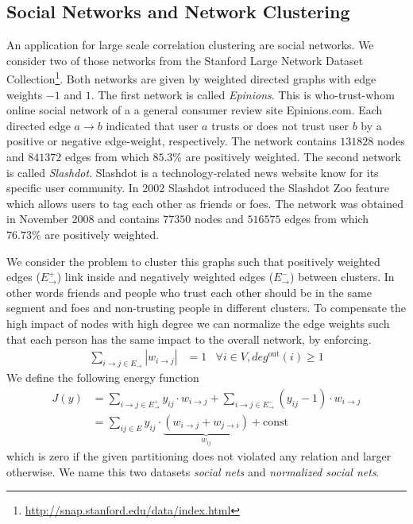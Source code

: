 \documentclass[10pt,twocolumn,letterpaper]{article}
\theoremstyle{definition}
\begin{document}
\subsection{Social Networks and Network Clustering}\label{sec:nets}
An application for large scale correlation clustering are social networks.
We consider two of those networks from the Stanford Large Network Dataset Collection\footnote{\url{http://snap.stanford.edu/data/index.html}}.
Both networks are given by weighted directed graphs with edge weights $-1$ and $1$. 
%
The first network is called \emph{Epinions}. 
This is who-trust-whom online social network of a a general consumer review site Epinions.com. 
Each directed edge $a\to b$ indicated that user $a$ trusts  or does not trust user $b$ by a  positive or negative edge-weight, respectively.
The network contains $131828$ nodes and $841372$ edges from which $85.3\%$ are positively weighted.
%
The second network is called \emph{Slashdot}. 
Slashdot is a technology-related news website know for its specific user community. 
In 2002 Slashdot introduced the Slashdot Zoo feature which allows users to tag each other as friends or foes. 
The network was obtained in November 2008 and contains $77350$ nodes and $516575$ edges from which $76.73\%$ are positively weighted.

We consider the problem to cluster this graphs such that positively weighted edges ($E^+_{\to}$) link inside and negatively weighted edges ($E^-_{\to}$) between clusters.
In other words friends and people who trust each other should be in the same segment and foes and non-trusting people in different clusters.
% 
To compensate the high impact of nodes with high degree we can normalize the edge weights such that each person has the same impact to the overall network, by enforcing.
\begin{align}
  \sum_{i\to j \in E_{\to}} |w_{i\to j}| &= 1&\forall i\in V, deg^{\textrm{out}}(i)\geq 1 
\end{align}
We define the following energy function
\begin{align}
 J(y) &= \sum_{i\to j \in E^+_{\to}} y_{ij}\cdot w_{i \to j} +  \sum_{i\to j \in E^-_{\to}} (y_{ij}-1)\cdot w_{i \to j} \nonumber\\
      &= \sum_{ij \in E} y_{ij}\cdot \underbrace{(w_{i \to j}+w_{j \to i})}_{w_{ij}} + \textrm{const}
\end{align}
which is zero if the given partitioning does not violated any relation and larger otherwise.
We name this two datasets \emph{social nets} and \emph{normalized social nets}.
\end{document}
